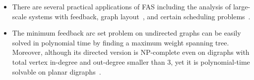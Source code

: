 \documentclass{article}
\begin{document}
\begin{itemize}
    \item There are several practical applications of FAS including the analysis of large-scale systems with feedback, graph layout~\cite{sugiyama_methods_1981}, and certain scheduling problems~\cite{flood_exact_1990}.
    \item The minimum feedback arc set problem on undirected graphs can be easily solved in polynomial time by finding a maximum weight spanning tree. Moreover, although its directed version is NP-complete even on digraphs with total vertex in-degree and out-degree smaller than 3, yet it is polynomial-time solvable on planar digraphs~\cite{lucchesi_minimax_1978}.
\end{itemize}



\end{document}
